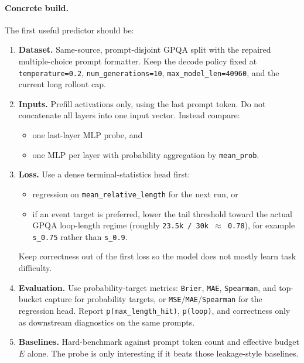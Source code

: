 \documentclass[11pt]{article}
\begin{document}
\paragraph{Concrete build.}
The first useful predictor should be:
\begin{enumerate}[leftmargin=1.5em]
\item \textbf{Dataset.} Same-source, prompt-disjoint GPQA split with the repaired
multiple-choice prompt formatter. Keep the decode policy fixed at
\texttt{temperature=0.2}, \texttt{num\_generations=10},
\texttt{max\_model\_len=40960}, and the current long rollout cap.
\item \textbf{Inputs.} Prefill activations only, using the last prompt token.
Do not concatenate all layers into one input vector. Instead compare:
\begin{itemize}[leftmargin=1.5em]
\item one last-layer MLP probe, and
\item one MLP per layer with probability aggregation by \texttt{mean\_prob}.
\end{itemize}
\item \textbf{Loss.} Use a dense terminal-statistics head first:
\begin{itemize}[leftmargin=1.5em]
\item regression on \texttt{mean\_relative\_length} for the next run, or
\item if an event target is preferred, lower the tail threshold toward the actual
GPQA loop-length regime (roughly \texttt{23.5k / 30k \(\approx\) 0.78}), for
example \texttt{s\_0.75} rather than \texttt{s\_0.9}.
\end{itemize}
Keep correctness out of the first loss so the model does not mostly learn task
difficulty.
\item \textbf{Evaluation.} Use probability-target metrics:
\texttt{Brier}, \texttt{MAE}, \texttt{Spearman}, and top-bucket capture for
probability targets, or \texttt{MSE}/\texttt{MAE}/\texttt{Spearman} for the
regression head. Report \texttt{p(max\_length\_hit)}, \texttt{p(loop)}, and
correctness only as downstream diagnostics on the same prompts.
\item \textbf{Baselines.} Hard-benchmark against prompt token count and effective
budget $E$ alone. The probe is only interesting if it beats those leakage-style
baselines.
\end{enumerate}
\end{document}
